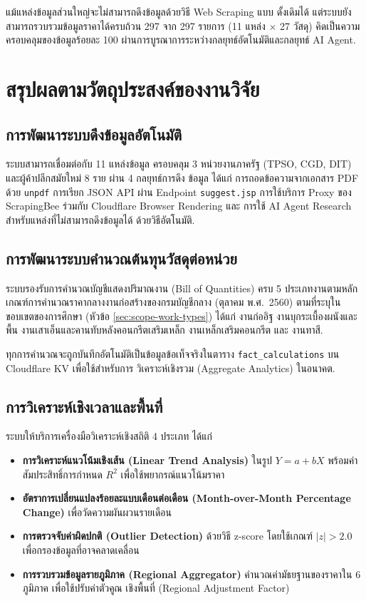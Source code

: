 แม้แหล่งข้อมูลส่วนใหญ่จะไม่สามารถดึงข้อมูลด้วยวิธี Web Scraping แบบ
ดั้งเดิมได้ แต่ระบบยังสามารถรวบรวมข้อมูลราคาได้ครบถ้วน 297 จาก 297
รายการ (11 แหล่ง $\times$ 27 วัสดุ) คิดเป็นความครอบคลุมของข้อมูลร้อยละ
100 ผ่านการบูรณาการระหว่างกลยุทธ์อัตโนมัติและกลยุทธ์ AI Agent.

\section{สรุปผลตามวัตถุประสงค์ของงานวิจัย}
\label{sec:summary-by-objective}

\subsection{การพัฒนาระบบดึงข้อมูลอัตโนมัติ}

ระบบสามารถเชื่อมต่อกับ 11 แหล่งข้อมูล ครอบคลุม 3 หน่วยงานภาครัฐ
(TPSO, CGD, DIT) และผู้ค้าปลีกสมัยใหม่ 8 ราย ผ่าน 4 กลยุทธ์การดึง
ข้อมูล ได้แก่ การถอดข้อความจากเอกสาร PDF ด้วย \texttt{unpdf}
การเรียก JSON API ผ่าน Endpoint \texttt{suggest.jsp} การใช้บริการ
Proxy ของ ScrapingBee ร่วมกับ Cloudflare Browser Rendering และ
การใช้ AI Agent Research สำหรับแหล่งที่ไม่สามารถดึงข้อมูลได้
ด้วยวิธีอัตโนมัติ.

\subsection{การพัฒนาระบบคำนวณต้นทุนวัสดุต่อหน่วย}

ระบบรองรับการคำนวณบัญชีแสดงปริมาณงาน (Bill of Quantities) ครบ 5
ประเภทงานตามหลักเกณฑ์การคำนวณราคากลางงานก่อสร้างของกรมบัญชีกลาง
(ตุลาคม พ.ศ.\ 2560) ตามที่ระบุในขอบเขตของการศึกษา (หัวข้อ
\ref{sec:scope-work-types}) ได้แก่ งานก่ออิฐ งานบุกระเบื้องผนังและพื้น
งานเสาเอ็นและคานทับหลังคอนกรีตเสริมเหล็ก งานเหล็กเสริมคอนกรีต และ
งานทาสี.

ทุกการคำนวณจะถูกบันทึกอัตโนมัติเป็นข้อมูลข้อเท็จจริงในตาราง
\texttt{fact\_calculations} บน Cloudflare KV เพื่อใช้สำหรับการ
วิเคราะห์เชิงรวม (Aggregate Analytics) ในอนาคต.

\subsection{การวิเคราะห์เชิงเวลาและพื้นที่}

ระบบให้บริการเครื่องมือวิเคราะห์เชิงสถิติ 4 ประเภท ได้แก่
\begin{itemize}[leftmargin=2em,itemsep=0.1em]
  \item \textbf{การวิเคราะห์แนวโน้มเชิงเส้น (Linear Trend Analysis)}
        ในรูป $Y = a + bX$ พร้อมค่าสัมประสิทธิ์การกำหนด $R^2$
        เพื่อใช้พยากรณ์แนวโน้มราคา
  \item \textbf{อัตราการเปลี่ยนแปลงร้อยละแบบเดือนต่อเดือน (Month-over-Month
        Percentage Change)} เพื่อวัดความผันผวนรายเดือน
  \item \textbf{การตรวจจับค่าผิดปกติ (Outlier Detection)} ด้วยวิธี
        z-score โดยใช้เกณฑ์ $|z| > 2.0$ เพื่อกรองข้อมูลที่อาจคลาดเคลื่อน
  \item \textbf{การรวบรวมข้อมูลรายภูมิภาค (Regional Aggregator)}
        คำนวณค่ามัธยฐานของราคาใน 6 ภูมิภาค เพื่อใช้ปรับค่าตัวคูณ
        เชิงพื้นที่ (Regional Adjustment Factor)
\end{itemize}

